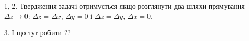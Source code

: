 \begin{solution}
    \begin{enumerate}
        \item[1, 2.] Твердження задачі отримується якщо розглянути два шляхи прямування $\Delta z \to 0$: $\Delta z = \Delta x$, $\Delta y = 0$ і $\Delta z = \Delta y$, $\Delta x = 0$. 
        \item[3.] І що тут робити ??
    \end{enumerate}
\end{solution}
